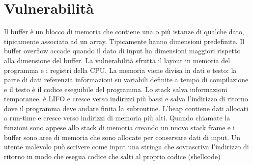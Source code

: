 \section{Vulnerabilit\`a}
Il buffer \`e un blocco di memoria che contiene una o pi\`u istanze di qualche dato, tipicamente associato ad un array. Tipicamente hanno dimensioni predefinite. Il buffer overflow 
accade quando il dato di input ha dimensioni maggiori rispetto alla dimensione del buffer. La vulnerabilit\`a sfrutta il layout in memoria del programma e i registri della CPU. 
La memoria viene divisa in dati e testo: la parte di dati referenzia informazioni su variabili definite a tempo di compilazione e il testo \`e il codice eseguibile del programma. 
Lo stack salva informazioni temporanee, \`e LIFO e cresce verso indirizzi pi\`u bassi e salva l'indirizzo di ritorno dove il programma deve andare finita la subroutine. L'heap contiene
dati allocati a run-time e cresce verso indirizzi di memoria pi\`u alti. Quando chiamate la funzioni sono appese allo stack di memoria creando un nuovo stack frame e i buffer sono 
aree di memoria che sono allocate per conservare dati di input. Un utente malevolo pu\`o scrivere come input una stringa che sovrascriva l'indirizzo di ritorno in modo che esegua codice
che salti al proprio codice (shellcode)

